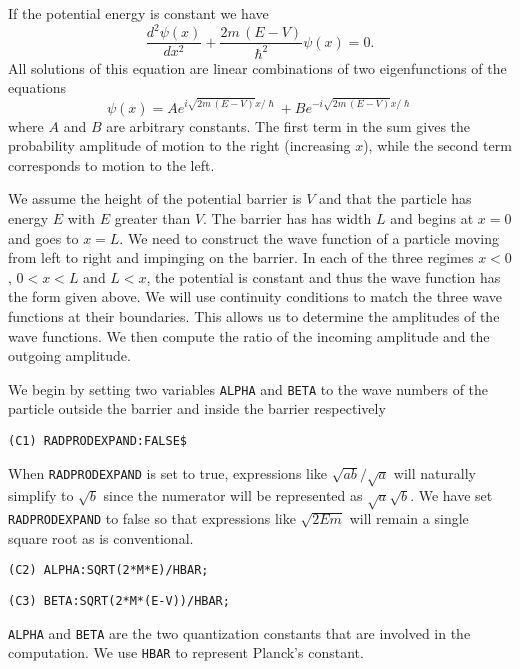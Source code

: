 If the potential energy is constant we have
\[
\frac{d^2 \psi(x)}{dx^2} + \frac{2 m\,(E - V)}{\hslash^2} \psi(x) = 0.
\]
All solutions of this equation are linear combinations of two eigenfunctions
of the equations
\[
\psi(x) =  A e^{i \sqrt{2m\,(E - V)} x/ \hslash} + B e^{- i \sqrt{2m\,(E
- V)} x/ \hslash} 
\]
where $A$ and $B$ are arbitrary constants.  The first term in the sum gives
the probability amplitude of motion to the right (increasing $x$), while the
second term corresponds to motion to the left.  

We assume the height of the potential barrier is $V$ and that the
particle has energy $E$ with $E$ greater than $V$.
The barrier has has width $L$ and begins at $x=0$ and goes to
$x=L$.  We need to construct the wave function of a particle moving from
left to right and impinging on the barrier.  In each of the three regimes
$x<0$, $0<x<L$ and $L<x$, the potential is constant and thus the wave
function has the form given above.  We will use continuity conditions to
match the three wave functions at their boundaries.  This allows us to
determine the amplitudes of the wave functions.  We then compute the ratio
of the incoming amplitude and the outgoing amplitude.

We begin by setting two variables {\tt ALPHA} and {\tt BETA} to the wave
numbers of the particle outside the barrier and inside the barrier respectively
\begin{verbatim}
(C1) RADPRODEXPAND:FALSE$
\end{verbatim}
When {\tt RADPRODEXPAND} is set to true, expressions like $\sqrt{a b} /
\sqrt{a}$ will naturally simplify to $\sqrt{b}$ since the numerator will be
represented as $\sqrt{a} \sqrt{b}$.  We have set {\tt RADPRODEXPAND} to
false so that expressions like $\sqrt{2Em}$ will remain a single square
root as is conventional.
\begin{verbatim}
(C2) ALPHA:SQRT(2*M*E)/HBAR;
\end{verbatim}
\begin{verbatim}
(C3) BETA:SQRT(2*M*(E-V))/HBAR;
\end{verbatim}
{\tt ALPHA} and {\tt BETA} are the two quantization constants that are
involved in the computation.  We use {\tt HBAR} to represent Planck's
constant.

